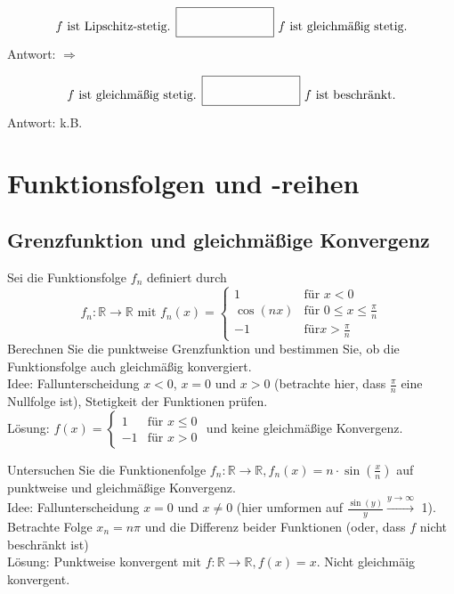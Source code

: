 \documentclass[parskip=full]{scrartcl}
\begin{document}
\begin{displaymath}
  f \text{ ist Lipschitz-stetig. } \fbox{\rule{1in}{0pt}\rule[-0.5ex]{0pt}{4ex}} \text{ } f \text{ ist gleichmäßig stetig.}
\end{displaymath}
Antwort: $\Rightarrow$

\begin{displaymath}
  f \text{ ist gleichmäßig stetig. } \fbox{\rule{1in}{0pt}\rule[-0.5ex]{0pt}{4ex}} \text{ } f \text{ ist beschränkt.}
\end{displaymath}
Antwort: k.B.

\section{Funktionsfolgen und -reihen}
\subsection{Grenzfunktion und gleichmäßige Konvergenz}
Sei die Funktionsfolge $f_n$ definiert durch
\begin{displaymath}
  f_n : \mathbb{R} \to \mathbb{R} \text{ mit } f_n(x)=
  \begin{cases}
    1        & \text{für } x < 0\\
    \cos(nx) & \text{für } 0 \leq x \leq \frac{\pi}{n}\\
    -1       &\text{für} x > \frac{\pi}{n} 
  \end{cases}
\end{displaymath}
Berechnen Sie die punktweise Grenzfunktion und bestimmen Sie, ob die Funktionsfolge auch gleichmäßig konvergiert.\\
Idee: Fallunterscheidung $x < 0$, $x = 0$ und $x > 0$ (betrachte hier, dass $\frac{\pi}{n}$ eine Nullfolge ist), Stetigkeit der Funktionen prüfen.\\
Lösung: $f(x) = \begin{cases} 1 & \text{für } x \leq 0\\ -1 & \text{für } x > 0\end{cases}$ und keine gleichmäßige Konvergenz.

Untersuchen Sie die Funktionenfolge $f_n : \mathbb{R} \to \mathbb{R}, f_n(x) = n \cdot \sin\left(\frac{x}{n}\right)$ auf punktweise und gleichmäßige Konvergenz.\\
Idee: Fallunterscheidung $x = 0$ und $x \neq 0$ (hier umformen auf $\frac{\sin(y)}{y} \xrightarrow{y \to \infty}$ 1).
Betrachte Folge $x_n = n\pi$ und die Differenz beider Funktionen (oder, dass $f$ nicht beschränkt ist)\\
Lösung: Punktweise konvergent mit $f : \mathbb{R} \to \mathbb{R}, f(x) = x$. Nicht gleichmäig konvergent.
\end{document}
